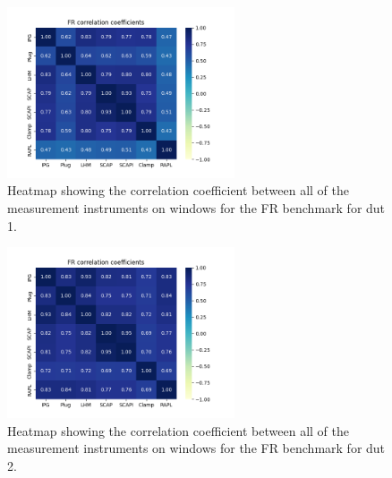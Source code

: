 \begin{figure}[H]
    \centering
    \hspace*{-1cm} %
    \includegraphics[width=0.6\textwidth]{figures/Fannkuch-reduxDut1.png}
    \caption{Heatmap showing the correlation coefficient between all of the measurement instruments on windows for the FR benchmark for dut 1.}
    \label{fig:FRCorrDut1}
\end{figure}

\begin{figure}[H]
    \centering
    \hspace*{-1cm} %
    \includegraphics[width=0.6\textwidth]{figures/Fannkuch-reduxDut2.png}
    \caption{Heatmap showing the correlation coefficient between all of the measurement instruments on windows for the FR benchmark for dut 2.}
    \label{fig:FRCorrDut2}
\end{figure}